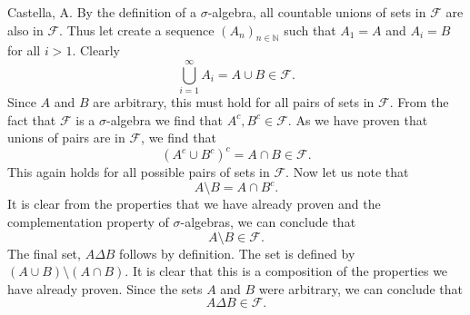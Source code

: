 
\begin{solution}[2.2]{Castella, A.}
    By the definition of a $\sigma$-algebra, all countable unions of sets in $\mathcal{F}$ are also in $\mathcal{F}$. Thus let create a sequence $(A_n)_{n\in\mathbb{N}}$ such that $A_1 = A$ and $A_i = B$ for all $i > 1$. Clearly
    $$
        \bigcup_{i=1}^\infty A_i = A\cup B \in \mathcal{F}.
    $$
    Since $A$ and $B$ are arbitrary, this must hold for all pairs of sets in $\mathcal{F}$. From the fact that $\mathcal{F}$ is a $\sigma$-algebra we find that $A^c,B^c \in \mathcal{F}$. As we have proven that unions of pairs are in $\mathcal{F}$, we find that
    $$
        (A^c \cup B^c)^c = A\cap B \in \mathcal{F}.
    $$
    This again holds for all possible pairs of sets in $\mathcal{F}$. Now let us note that
    $$
        A\setminus B = A\cap B^c.
    $$
    It is clear from the properties that we have already proven and the complementation property of $\sigma$-algebras, we can conclude that
    $$
        A\setminus B \in \mathcal{F}.
    $$
    The final set, $A\Delta B$ follows by definition. The set is defined by $(A\cup B)\setminus (A\cap B)$. It is clear that this is a composition of the properties we have already proven. Since the sets $A$ and $B$ were arbitrary, we can conclude that
    $$
        A\Delta B \in \mathcal{F}.
    $$
\end{solution}

